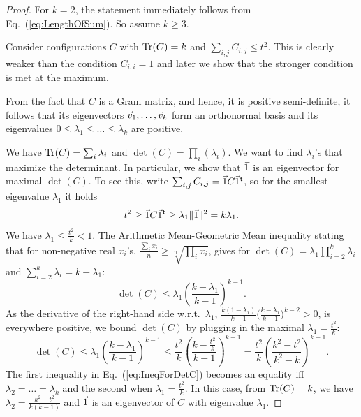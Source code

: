 \begin{proof}
	For $k=2$, the statement immediately follows from Eq.~(\ref{eq:LengthOfSum}). So assume $k \geq 3$. 
	
	Consider configurations $C$ with $\text{Tr}(C) = k$ and $\sum_{i,j} C_{i,j} \leq t^2$. This is clearly weaker than the condition $C_{i,i}=1$ and later we show that the stronger condition is met at the maximum.
	
	From the fact that $C$ is a Gram matrix, and hence, it is positive semi-definite, it follows that its eigenvectors $\vvec_1, \ldots, \vvec_k$ form an orthonormal basis and its eigenvalues $0 \leq \lambda_1 \leq \ldots \leq \lambda_k$ are positive. 
	
	We have $\text{Tr}(C) = \sum_i \lambda_i$ and $\det(C) = \prod_i(\lambda_i)$. We want to find $\lambda_i$'s that maximize the determinant. In particular, we show that $\vec 1$ is an eigenvector for maximal $\det(C)$. To see this, write $\sum_{i,j} C_{i,j}  = \vec 1 C \vec 1\mkern0.7mu^{\mathsf{ t}}$, so for the smallest eigenvalue $\lambda_1$ it holds
	\begin{equation} \label{eq:SmallestEigenvalue}
		t^2 \geq \vec 1 C \vec 1\mkern0.7mu^{\mathsf{ t}} \geq \lambda_1 \| \vec 1 \|^2 = k \lambda_1.
	\end{equation}
	We have $\lambda_1 \leq \tfrac{t^2}{k} < 1$. The Arithmetic Mean-Geometric Mean inequality stating that for non-negative real $x_i$'s, $ \tfrac{\sum_i x_i}{n} \geq \sqrt[n]{\prod_i x_i}$, gives for $\det(C) = \lambda_1 \prod_{i=2}^k \lambda_i$ and $\sum_{i=2}^k \lambda_i = k - \lambda_1$:
	\[
			\det(C) \leq \lambda_1 \left( \frac{k-\lambda_1}{k-1} \right)^{k-1}.
	\]
	As the derivative of the right-hand side w.r.t.\ $\lambda_1$, $ \tfrac{k(1-\lambda_1)}{k-1} \bigl( \tfrac{k-\lambda_1}{k-1} \bigr) ^{k-2} > 0$, is everywhere positive, we bound $\det(C)$ by plugging in the maximal $\lambda_1 = \tfrac{t^2}{k}$:
	\begin{equation} \label{eq:IneqForDetC}
		\det(C) \leq \lambda_1 \left( \frac{k-\lambda_1}{k-1} \right)^{k-1} \leq \frac{t^2}{k} \left( \frac{k - \tfrac{t^2}{k}}{k-1}\right)^{k-1} = \frac{t^2}{k} \left( \frac{k^2 - t^2}{k^2-k}\right)^{k-1}.
	\end{equation}
	The first inequality in Eq.~(\ref{eq:IneqForDetC}) becomes an equality iff $\lambda_2 = \ldots = \lambda_k$ and the second  when $\lambda_1  = \tfrac{t^2}{k}$. In this case, from $\text{Tr}(C) = k$, we have $\lambda_2 = \tfrac{k^2-t^2}{k(k-1)}$ and $\vec 1$ is an eigenvector of $C$ with eigenvalue $\lambda_1$. 
	

\end{proof}
